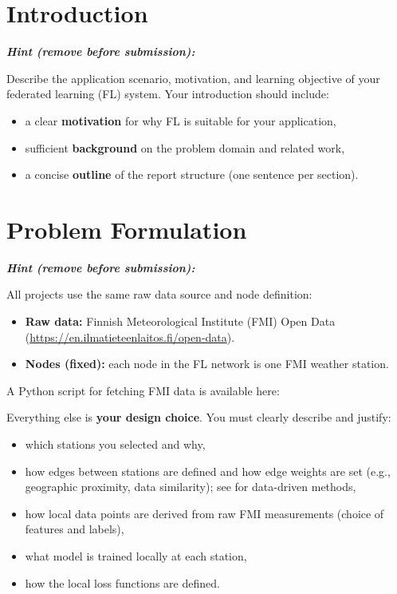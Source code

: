 \documentclass{article}
\newenvironment{hint}{%
	\par\medskip\noindent
	\begin{minipage}[t]{\dimexpr\columnwidth-8mm}%
	\raggedright\itshape
	\textbf{Hint (remove before submission):}\space
}{%
	\end{minipage}\par\medskip
}
\begin{document}
\section{Introduction}
\label{sec:intro}

\begin{hint}
	Describe the application scenario, motivation, and learning objective of your
	federated learning (FL) system.
	Your introduction should include:
	\begin{itemize}
		\item a clear \textbf{motivation} for why FL is suitable for your application,
		\item sufficient \textbf{background} on the problem domain and related work,
		\item a concise \textbf{outline} of the report structure (one sentence per section).
	\end{itemize}
\end{hint}


\section{Problem Formulation}
\label{sec:pf}
\begin{hint}
	All projects use the same raw data source and node definition:
	\begin{itemize}
		\item \textbf{Raw data:} Finnish Meteorological Institute (FMI) Open Data
		(\url{https://en.ilmatieteenlaitos.fi/open-data}).
		\item \textbf{Nodes (fixed):} each node in the FL network is one FMI weather station.
	\end{itemize}
	A Python script for fetching FMI data is available here:

	\medskip
	Everything else is \textbf{your design choice}. You must clearly
	describe and justify:
	\begin{itemize}
		\item which stations you selected and why,
		\item how edges between stations are defined and how edge weights are set
		(e.g., geographic proximity, data similarity);
		see \cite[Ch.~7]{Jung2025} for data-driven methods,
		\item how local data points are derived from raw FMI measurements
		(choice of features and labels),
		\item what model is trained locally at each station,
		\item how the local loss functions are defined.
	\end{itemize}
\end{hint}
\end{document}
